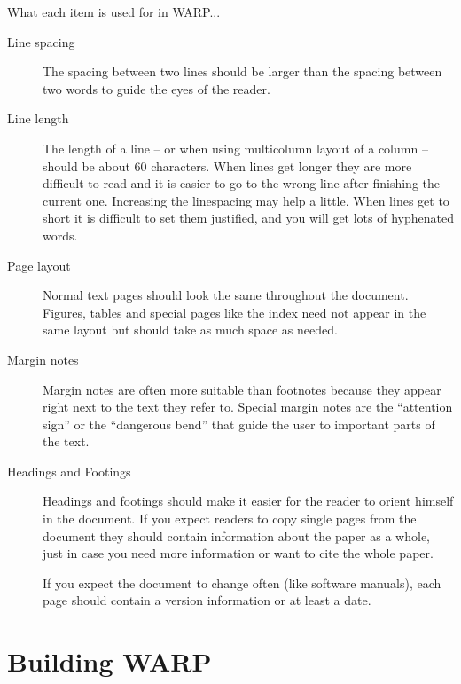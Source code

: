 \documentclass[twoside,a4paper]{refart}
\begin{document}
What each item is used for in WARP...

\begin{description}

\item[Line spacing]
        The spacing between two lines should be larger than the spacing 
        between two words to guide the eyes of the reader.

\item[Line length]
        The length of a line -- or when using multicolumn layout of a 
        column -- should be about 60 characters. When lines get longer they 
        are more difficult to read and it is easier to go to the wrong line 
        after finishing the current one. Increasing the linespacing may help a 
        little.
        When lines get to short it is difficult to set them justified, and you 
        will get lots of hyphenated words.
        
\item[Page layout]
        Normal text pages should look the same throughout the document. 
        Figures, tables and special pages like the index need not appear in 
        the same layout but should take as much space as needed.
        
\item[Margin notes]
        Margin notes are often more suitable than footnotes because they 
        appear right next to the text they refer to. Special margin notes are 
        the ``attention sign'' or the ``dangerous bend'' that guide the user 
        to important parts of the text.
        
\item[Headings and Footings]
        Headings and footings should make it easier for the reader to orient
        himself in the document. If you expect readers to copy single pages
        from the document they should contain information about the paper as
        a whole, just in case you need more information or want to cite the
        whole paper.
        
        If you expect the document to change often (like software manuals),
        each page should contain a version information or at least a date.
        
\end{description}

\section{Building WARP}
\end{document}

